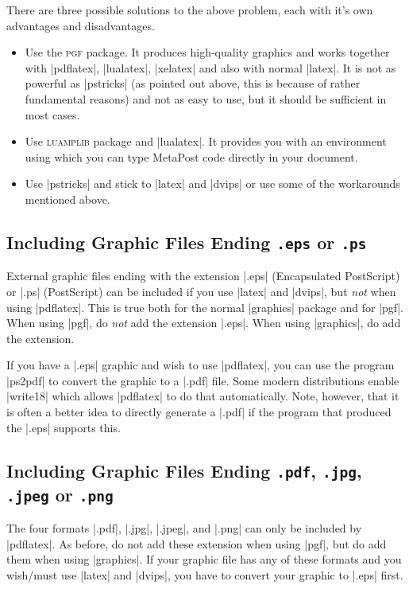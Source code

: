 There are three possible solutions to the above problem, each with it's own advantages and disadvantages.
\begin{itemize}
\item
  Use the \textsc{pgf} package. It produces high-quality graphics and works together with |pdflatex|, |lualatex|, |xelatex| and also with normal |latex|. It is not as powerful as |pstricks| (as pointed out above, this is because of rather fundamental reasons) and not as easy to use, but it should be sufficient in most cases.
\item
  Use \textsc{luamplib} package and |lualatex|. It provides you with an environment using which you can type MetaPost code directly in your document.
\item
  Use |pstricks| and stick to |latex| and |dvips| or use some of the workarounds mentioned above.
\end{itemize}


\subsection{Including Graphic Files Ending \texttt{.eps} or \texttt{.ps}}

External graphic files ending with the extension |.eps| (Encapsulated PostScript) or |.ps| (PostScript) can be included if you use |latex| and |dvips|, but \emph{not} when using |pdflatex|. This is true both for the normal |graphics| package and for |pgf|. When using |pgf|, do \emph{not} add the extension |.eps|. When using |graphics|, do add the extension.

If you have a |.eps| graphic and wish to use |pdflatex|, you can use the program |ps2pdf| to convert the graphic to a |.pdf| file. Some modern distributions enable |write18| which allows |pdflatex| to do that automatically. Note, however, that it is often a better idea to directly generate a |.pdf| if the program that produced the |.eps| supports this.


\subsection{Including Graphic Files Ending \texttt{.pdf}, \texttt{.jpg}, \texttt{.jpeg} or \texttt{.png}}

The four formats |.pdf|, |.jpg|, |.jpeg|, and |.png| can only be included by |pdflatex|. As before, do not add these extension when using |pgf|, but do add them when using |graphics|. If your graphic file has any of these formats and you wish/must use |latex| and |dvips|, you  have to convert your graphic to |.eps| first.


